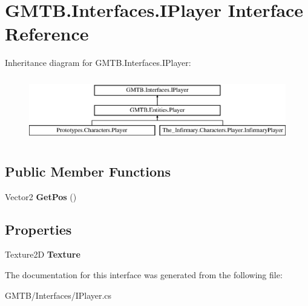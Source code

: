 \hypertarget{interface_g_m_t_b_1_1_interfaces_1_1_i_player}{}\section{G\+M\+T\+B.\+Interfaces.\+I\+Player Interface Reference}
\label{interface_g_m_t_b_1_1_interfaces_1_1_i_player}
Inheritance diagram for G\+M\+T\+B.\+Interfaces.\+I\+Player\+:\begin{figure}[H]
\begin{center}
\leavevmode
\includegraphics[height=2.828283cm]{interface_g_m_t_b_1_1_interfaces_1_1_i_player}
\end{center}
\end{figure}
\subsection*{Public Member Functions}
\begin{DoxyCompactItemize}
\item 
\mbox{\label{interface_g_m_t_b_1_1_interfaces_1_1_i_player_a01780709b1ef21449a8c1404b91f0e19}} 
Vector2 {\bfseries Get\+Pos} ()
\end{DoxyCompactItemize}
\subsection*{Properties}
\begin{DoxyCompactItemize}
\item 
\mbox{\label{interface_g_m_t_b_1_1_interfaces_1_1_i_player_a62f6873bd27e6badc4312de8051086bc}} 
Texture2D {\bfseries Texture}
\end{DoxyCompactItemize}


The documentation for this interface was generated from the following file\+:\begin{DoxyCompactItemize}
\item 
G\+M\+T\+B/\+Interfaces/I\+Player.\+cs\end{DoxyCompactItemize}
